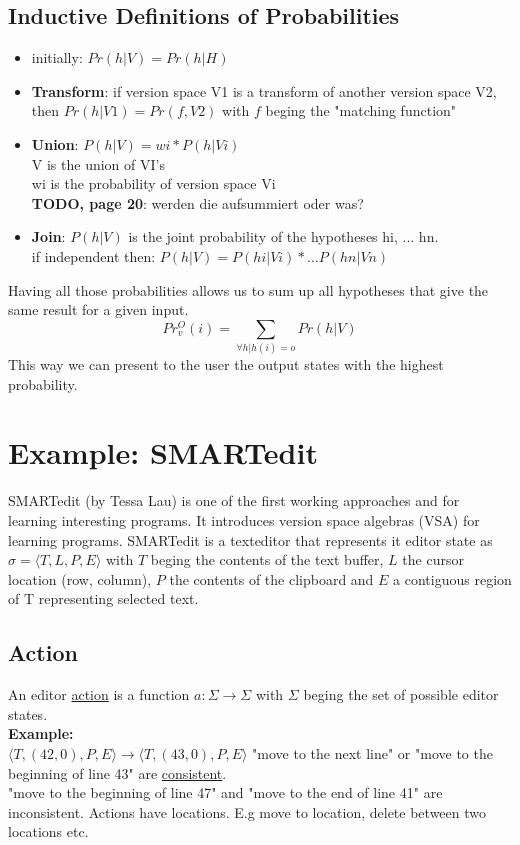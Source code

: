 \subsection{Inductive Definitions of Probabilities}
\begin{itemize}
    \item initially: $Pr(h | V) = Pr(h | H)$
    \item \textbf{Transform}: if version space V1 is a transform of another version space V2, then $Pr(h | V1) = Pr(f, V2)$ with $f$ beging the "matching function"
    \item \textbf{Union}: $P(h | V) = wi * P(h | Vi)$ \\
        V is the union of VI's \\
        wi is the probability of version space Vi\\
        \textbf{TODO, page 20}: werden die aufsummiert oder was? 
    \item \textbf{Join}: $P(h | V)$ is the joint probability of the hypotheses hi, ... hn.\\
        if independent then: $P(h | V) = P(hi | Vi) * ... P(hn | Vn)$
\end{itemize}
Having all those probabilities allows us to sum up all hypotheses that give the same result for a given input.
\begin{equation}
    \label{output_probabilities}
    Pr_v^O(i) = \sum_{\forall h | h(i) = o} Pr(h | V)
\end{equation}
This way we can present to the user the output states with the highest probability.
\section{Example: SMARTedit}
SMARTedit (by Tessa Lau) is one of the first working approaches and for learning interesting programs. It introduces version space algebras (VSA) for learning programs.
SMARTedit is a texteditor that represents it editor state as $\sigma=\langle T,L,P,E \rangle$ with $T$ beging the contents of the text buffer, $L$ the cursor location (row, column), $P$ the contents of the clipboard and $E$ a contiguous region of T representing selected text.\\
\subsection{Action}
An editor \underline{action} is a function $a: \Sigma \to \Sigma$ with $\Sigma$ beging the set of possible editor states.\\
\textbf{Example:}\\
$\langle T, (42,0), P, E\rangle \to \langle T, (43,0), P, E\rangle$
"move to the next line" or "move to the beginning of line 43" are \underline{consistent}. \\
"move to the beginning of line 47" and "move to the end of line 41" are inconsistent.
Actions have locations. E.g move to location, delete between two locations etc.
